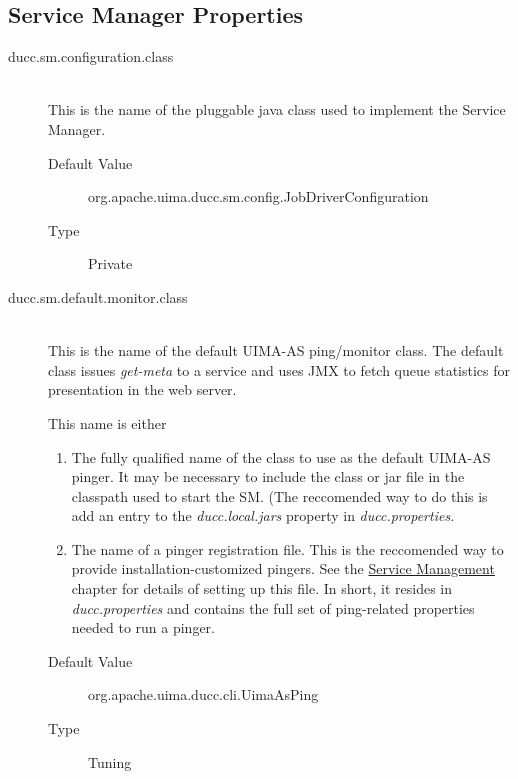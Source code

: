 \subsection{Service Manager Properties}
    \begin{description}

      \item[ducc.sm.configuration.class] \hfill \\
        This is the name of the pluggable java class used to implement the Service Manager. 
        \begin{description}
          \item[Default Value] org.apache.uima.ducc.sm.config.JobDriverConfiguration 
          \item[Type] Private 
        \end{description}

      \item[ducc.sm.default.monitor.class] \hfill \\
        This is the name of the default UIMA-AS ping/monitor class.  The default class issues
        {\em get-meta} to a service and uses JMX to fetch queue statistics for presentation in
        the web server.

        This name is either
        \begin{enumerate}
          \item The fully qualified name of the class to use as the default UIMA-AS pinger. It may
            be necessary to include the class or jar file in the classpath used to start the SM.
            (The reccomended way to do this is add an entry to the {\em ducc.local.jars} property
            in {\em ducc.properties.}

          \item The name of a pinger registration file.  This is the reccomended way to 
            provide installation-customized pingers.  See the \hyperref[chap:sm]{Service Management}
            chapter for details of setting up this file.  In short, it resides in {\em ducc.properties}
            and contains the full set of ping-related properties needed to run a pinger.
        \end{enumerate}
        
        \begin{description}
          \item[Default Value] org.apache.uima.ducc.cli.UimaAsPing
          \item[Type] Tuning 
        \end{description}
        

\end{description}
